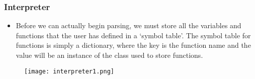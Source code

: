 \documentclass{article}
\begin{document}
\subsubsection{{\large Interpreter}}
\begin{itemize}
\item Before we can actually begin parsing, we must store all the variables and functions that the user has defined in a `symbol table'. The symbol table for functions is simply a dictionary, where the key is the function name and the value will be an instance of the class used to store functions.
\end{itemize}
\begin{figure}[H]
    \centering
\texttt{[image: interpreter1.png]}
    \label{fig:my_label}
\end{figure}
\end{document}
